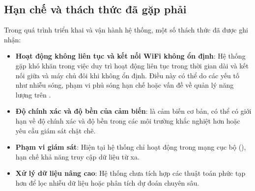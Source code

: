 \subsection{Hạn chế và thách thức đã gặp phải}
Trong quá trình triển khai và vận hành hệ thống, một số thách thức đã được ghi nhận:
\begin{itemize}
	\item \textbf{Hoạt động không liên tục và kết nối WiFi không ổn định}: Hệ thống gặp khó khăn trong việc duy trì hoạt động liên tục trong thời gian dài và kết nối  giữa  và máy chủ  đôi khi không ổn định. Điều này có thể do các yếu tố như nhiễu sóng, phạm vi phủ sóng hạn chế hoặc vấn đề về quản lý năng lượng trên .
	\item \textbf{Độ chính xác và độ bền của cảm biến}:  là cảm biến cơ bản, có thể có giới hạn về độ chính xác và độ bền trong các môi trường khắc nghiệt hơn hoặc yêu cầu giám sát chặt chẽ.
	\item \textbf{Phạm vi giám sát}: Hiện tại hệ thống chỉ hoạt động trong mạng cục bộ (), hạn chế khả năng truy cập dữ liệu từ xa.
	\item \textbf{Xử lý dữ liệu nâng cao}: Hệ thống chưa tích hợp các thuật toán phức tạp hơn để lọc nhiễu dữ liệu hoặc phân tích dự đoán chuyên sâu.
\end{itemize}